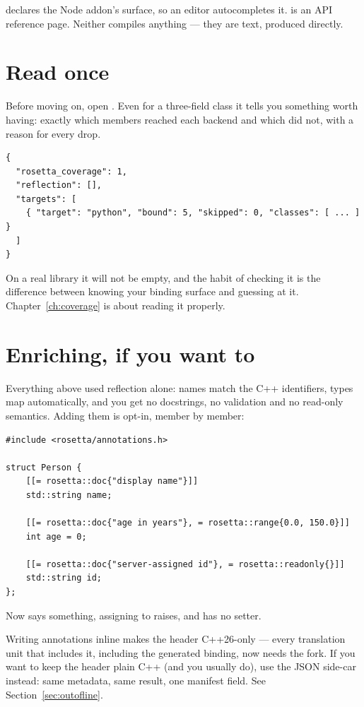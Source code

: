  declares the Node addon's surface, so an
editor autocompletes it.  is an API reference
page. Neither compiles anything --- they are text, produced directly.

\section{Read  once}

Before moving on, open . Even for a three-field
class it tells you something worth having: exactly which members reached each
backend and which did not, with a reason for every drop.

\begin{lstlisting}[style=json]
{
  "rosetta_coverage": 1,
  "reflection": [],
  "targets": [
    { "target": "python", "bound": 5, "skipped": 0, "classes": [ ... ] }
  ]
}
\end{lstlisting}

On a real library it will not be empty, and the habit of checking it is the
difference between knowing your binding surface and guessing at it.
Chapter~\ref{ch:coverage} is about reading it properly.

\section{Enriching, if you want to}

Everything above used reflection alone: names match the C++ identifiers, types
map automatically, and you get no docstrings, no validation and no read-only
semantics. Adding them is opt-in, member by member:

\begin{lstlisting}[style=cpp]
#include <rosetta/annotations.h>

struct Person {
    [[= rosetta::doc{"display name"}]]
    std::string name;

    [[= rosetta::doc{"age in years"}, = rosetta::range{0.0, 150.0}]]
    int age = 0;

    [[= rosetta::doc{"server-assigned id"}, = rosetta::readonly{}]]
    std::string id;
};
\end{lstlisting}

Now  says something, assigning  to
 raises, and  has no setter.

\begin{warn}
Writing annotations inline makes the header C++26-only --- every translation
unit that includes it, including the generated binding, now needs the fork.
If you want to keep the header plain C++ (and you usually do), use the JSON
side-car instead: same metadata, same result, one manifest field.
See Section~\ref{sec:outofline}.
\end{warn}


